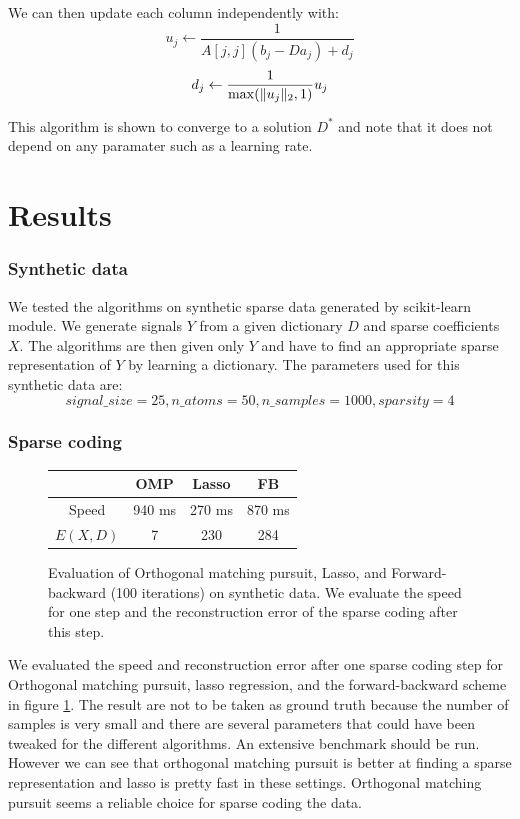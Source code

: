 \documentclass[a4paper,11pt]{article}
\DeclarePairedDelimiter\norm{\lVert}{\rVert} %
\begin{document}
We can then update each column independently with:
$$ u_j \leftarrow \frac{1}{A[j,j](b_j - D a_j) + d_j} $$
$$ d_j \leftarrow \frac{1}{\max(\norm{u_j}_2, 1)} u_j $$

This algorithm is shown to converge to a solution $D^*$ and note that it does not depend on any paramater such as a learning rate.

\section{Results}
\subsubsection*{Synthetic data}
We tested the algorithms on synthetic sparse data generated by scikit-learn module. We generate signals $Y$ from a given dictionary $D$ and sparse coefficients $X$. The algorithms are then given only $Y$ and have to find an appropriate sparse representation of $Y$ by learning a dictionary.
The parameters used for this synthetic data are:
$$signal\_size=25, n\_atoms=50, n\_samples=1000, sparsity=4$$

\subsubsection*{Sparse coding}

\begin{figure}[!htbp]
\begin{tabular}{|c|c|c|c|}
  \hline
  & OMP & Lasso & FB \\ \hline
  Speed & 940 ms & 270 ms & 870 ms \\ \hline
  $E(X,D)$ & 7 & 230 & 284 \\ \hline
\end{tabular}
  \caption{Evaluation of Orthogonal matching pursuit, Lasso, and Forward-backward (100 iterations) on synthetic data. We evaluate the speed for one step and the reconstruction error of the sparse coding after this step.}
  \label{sparse_coding_perfs}
\end{figure}
We evaluated the speed and reconstruction error after one sparse coding step for Orthogonal matching pursuit, lasso regression, and the forward-backward scheme in figure \ref{sparse_coding_perfs}.
The result are not to be taken as ground truth because the number of samples is very small and there are several parameters that could have been tweaked for the different algorithms. An extensive benchmark should be run.
However we can see that orthogonal matching pursuit is better at finding a sparse representation and lasso is pretty fast in these settings. Orthogonal matching pursuit seems a reliable choice for sparse coding the data.
\end{document}
